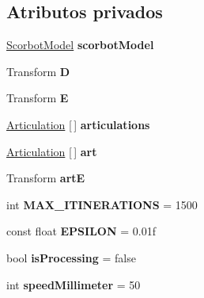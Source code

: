 \subsection*{Atributos privados}
\begin{DoxyCompactItemize}
\item 
\mbox{\label{class_i_k_adcd01966b5a64adc0a00bc71d93f20f5}} 
\mbox{\hyperlink{class_scorbot_model}{Scorbot\+Model}} {\bfseries scorbot\+Model}
\item 
\mbox{\label{class_i_k_aeda196da26592113cfbeb37ce08c98e0}} 
Transform {\bfseries D}
\item 
\mbox{\label{class_i_k_abfcf0b83294daebc45f90599cefa6229}} 
Transform {\bfseries E}
\item 
\mbox{\label{class_i_k_a57627b5cca74a00c64e634a594ce1771}} 
\mbox{\hyperlink{class_articulation}{Articulation}} \mbox{[}$\,$\mbox{]} {\bfseries articulations}
\item 
\mbox{\label{class_i_k_a04cbf786c36a2dd4c351004aa368e516}} 
\mbox{\hyperlink{class_articulation}{Articulation}} \mbox{[}$\,$\mbox{]} {\bfseries art}
\item 
\mbox{\label{class_i_k_a03fd580172cd3b0291accbe80a196dc4}} 
Transform {\bfseries artE}
\item 
\mbox{\label{class_i_k_a0c00a388b3d050426ab61e12bf27a273}} 
int {\bfseries M\+A\+X\+\_\+\+I\+T\+I\+N\+E\+R\+A\+T\+I\+O\+NS} = 1500
\item 
\mbox{\label{class_i_k_ae5c8e8a09e081841fce1b05f9011eff2}} 
const float {\bfseries E\+P\+S\+I\+L\+ON} = 0.\+01f
\item 
\mbox{\label{class_i_k_a80d856621b05838051c780a713c57a7a}} 
bool {\bfseries is\+Processing} = false
\item 
\mbox{\label{class_i_k_a9ccf13cced2d5f0264321b52d9f1e6a6}} 
int {\bfseries speed\+Millimeter} = 50
\end{DoxyCompactItemize}


